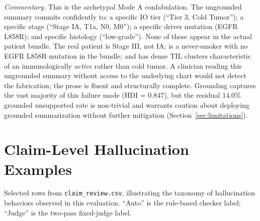 \documentclass{article}
\theoremstyle{plain}
\begin{document}
\emph{Commentary.} This is the archetypal Mode A confabulation. The ungrounded summary commits confidently to: a specific IO tier (``Tier 3, Cold Tumor''); a specific stage (``Stage IA, T1a, N0, M0''); a specific driver mutation (EGFR L858R); and specific histology (``low-grade''). None of these appear in the actual patient bundle. The real patient is Stage III, not IA; is a never-smoker with no EGFR L858R mutation in the bundle; and has dense TIL clusters characteristic of an immunologically \emph{active} rather than cold tumor. A clinician reading this ungrounded summary without access to the underlying chart would not detect the fabrication; the prose is fluent and structurally complete. Grounding captures the vast majority of this failure mode (HDI = 0.847), but the residual 14.0\% grounded unsupported rate is non-trivial and warrants caution about deploying grounded summarization without further mitigation (Section~\ref{sec:limitations}).

\section{Claim-Level Hallucination Examples}
\label{app:claim-examples}

Selected rows from \texttt{claim\_review.csv}, illustrating the taxonomy of hallucination behaviors observed in this evaluation. ``Auto'' is the rule-based checker label; ``Judge'' is the two-pass fixed-judge label.
\end{document}
